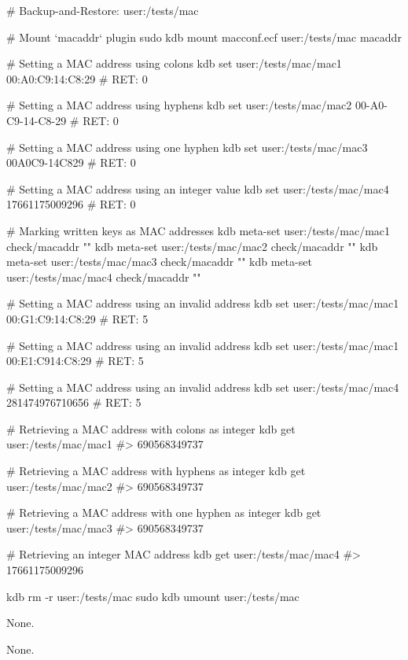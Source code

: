 \begin{DoxyCode}
# Backup-and-Restore: user:/tests/mac

# Mount `macaddr` plugin
sudo kdb mount macconf.ecf user:/tests/mac macaddr

# Setting a MAC address using colons
kdb set user:/tests/mac/mac1 00:A0:C9:14:C8:29
# RET: 0

# Setting a MAC address using hyphens
kdb set user:/tests/mac/mac2 00-A0-C9-14-C8-29
# RET: 0

# Setting a MAC address using one hyphen
kdb set user:/tests/mac/mac3 00A0C9-14C829
# RET: 0

# Setting a MAC address using an integer value
kdb set user:/tests/mac/mac4 17661175009296
# RET: 0

# Marking written keys as MAC addresses
kdb meta-set user:/tests/mac/mac1 check/macaddr ""
kdb meta-set user:/tests/mac/mac2 check/macaddr ""
kdb meta-set user:/tests/mac/mac3 check/macaddr ""
kdb meta-set user:/tests/mac/mac4 check/macaddr ""

# Setting a MAC address using an invalid address
kdb set user:/tests/mac/mac1 00:G1:C9:14:C8:29
# RET: 5

# Setting a MAC address using an invalid address
kdb set user:/tests/mac/mac1 00:E1:C914:C8:29
# RET: 5

# Setting a MAC address using an invalid address
kdb set user:/tests/mac/mac4 281474976710656
# RET: 5

# Retrieving a MAC address with colons as integer
kdb get user:/tests/mac/mac1
#> 690568349737

# Retrieving a MAC address with hyphens as integer
kdb get user:/tests/mac/mac2
#> 690568349737

# Retrieving a MAC address with one hyphen as integer
kdb get user:/tests/mac/mac3
#> 690568349737

# Retrieving an integer MAC address
kdb get user:/tests/mac/mac4
#> 17661175009296

kdb rm -r user:/tests/mac
sudo kdb umount user:/tests/mac
\end{DoxyCode}


None.

None. 